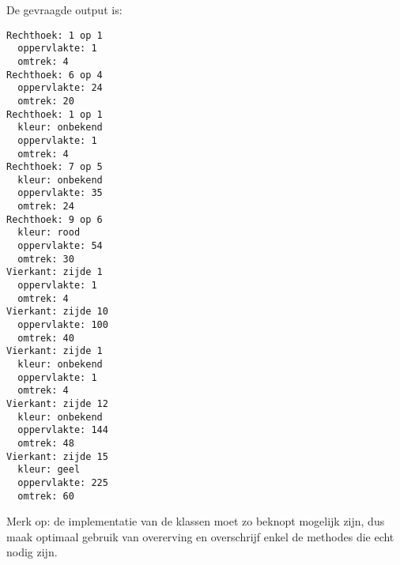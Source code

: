 De gevraagde output is:
\begin{footnotesize}
\begin{verbatim}
Rechthoek: 1 op 1
  oppervlakte: 1
  omtrek: 4
Rechthoek: 6 op 4
  oppervlakte: 24
  omtrek: 20
Rechthoek: 1 op 1
  kleur: onbekend
  oppervlakte: 1
  omtrek: 4
Rechthoek: 7 op 5
  kleur: onbekend
  oppervlakte: 35
  omtrek: 24
Rechthoek: 9 op 6
  kleur: rood
  oppervlakte: 54
  omtrek: 30
Vierkant: zijde 1
  oppervlakte: 1
  omtrek: 4
Vierkant: zijde 10
  oppervlakte: 100
  omtrek: 40
Vierkant: zijde 1
  kleur: onbekend
  oppervlakte: 1
  omtrek: 4
Vierkant: zijde 12
  kleur: onbekend
  oppervlakte: 144
  omtrek: 48
Vierkant: zijde 15
  kleur: geel
  oppervlakte: 225
  omtrek: 60
\end{verbatim}
\end{footnotesize}
Merk op: de implementatie van de klassen moet zo beknopt mogelijk zijn,
dus maak optimaal gebruik van overerving en overschrijf enkel de methodes die echt nodig zijn.
\endoef

